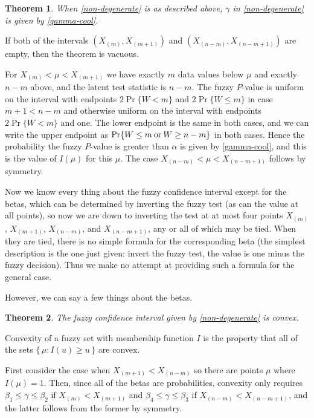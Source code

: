 \documentclass{article}
\newcommand{\opor}{\mathbin{\rm or}}
\newtheorem{theorem}{Theorem}
\begin{document}
\begin{theorem} \label{th:gamma}
When \eqref{non-degenerate} is as described above,
$\gamma$ in \eqref{non-degenerate} is given by \eqref{gamma-cool}.
\end{theorem}
If both of the intervals $(X_{(m)}, X_{(m + 1)})$ and
$(X_{(n - m)}, X_{(n - m + 1)})$ are empty, then the theorem is vacuous.

For $X_{(m)} < \mu < X_{(m + 1)}$
we have exactly $m$ data values below $\mu$ and exactly $n - m$ above,
and the latent test statistic is $n - m$.  The fuzzy $P$-value is uniform
on the interval with endpoints $2 \Pr\{ W < m \}$ and $2 \Pr \{ W \le m \}$
in case $m + 1 < n - m$ and otherwise uniform on the interval with
endpoints $2 \Pr\{ W < m \}$ and one.
The lower endpoint is the same in both cases, and we can write the upper
endpoint as $\Pr\{ W \le m \opor W \ge n - m \}$ in both cases.
Hence the probability the fuzzy $P$-value is greater than $\alpha$ is
given by \eqref{gamma-cool}, and this is the value of $I(\mu)$ for this
$\mu$.
The case $X_{(n - m)} < \mu < X_{(n - m + 1)}$ follows by symmetry.

Now we know every thing about the fuzzy confidence interval except for
the betas, which can be determined by inverting the fuzzy test (as can
the value at all points), so now we are down to inverting the test at
at most four points
$X_{(m)}$, $X_{(m + 1)}$, $X_{(n - m)}$, and $X_{(n - m + 1)}$, any or
all of which may be tied.  When they are tied, there is no simple formula
for the corresponding beta (the simplest description is the one just given:
invert the fuzzy test, the value is one minus the fuzzy decision).
Thus we make no attempt at providing such a formula for the general case.

However, we can say a few things about the betas.
\begin{theorem} \label{th:convex}
The fuzzy confidence interval given by \eqref{non-degenerate} is convex.
\end{theorem}
Convexity of a fuzzy set with membership function $I$ is the property
that all of the sets $\{\, \mu : I(u) \ge u \,\}$ are convex.

First consider the case when $X_{(m + 1)} < X_{(n - m)}$ so there are
points $\mu$ where $I(\mu) = 1$.  Then, since all of the betas are
probabilities, convexity only requires
$\beta_1 \le \gamma \le \beta_2$ if $X_{(m)} < X_{(m + 1)}$
and
$\beta_4 \le \gamma \le \beta_3$ if $X_{(n - m)} < X_{(n - m + 1)}$,
and the latter follows from the former by symmetry.
\end{document}
